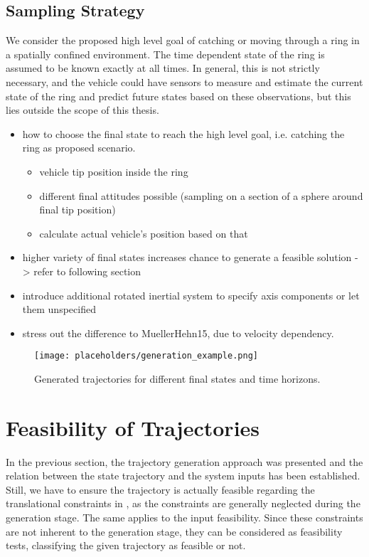 \subsection{Sampling Strategy}
We consider the proposed high level goal of catching or moving through a ring in a spatially confined environment. The time dependent state of the ring is assumed to be known exactly at all times. In general, this is not strictly necessary, and the vehicle could have sensors to measure and estimate the current state of the ring and predict future states based on these observations, but this lies outside the scope of this thesis.


\begin{itemize}
	\color{red}
	\item how to choose the final state to reach the high level goal, i.e. catching the ring as proposed scenario.
	\begin{itemize}
		\item vehicle tip position inside the ring
		\item different final attitudes possible (sampling on a section of a sphere around final tip position)
		\item calculate actual vehicle's position based on that
	\end{itemize}
	\item higher variety of final states increases chance to generate a feasible solution -> refer to following section
	\item introduce additional rotated inertial system to specify axis components or let them unspecified
	\item stress out the difference to MuellerHehn15, due to velocity dependency.
\end{itemize}
\begin{figure}[h!]
	\centering
	\texttt{[image: placeholders/generation\_example.png]}
	\caption{Generated trajectories for different final states and time horizons.}
\end{figure}
\section{Feasibility of Trajectories}
\label{sec:feasibility}
In the previous section, the trajectory generation approach was presented and the relation between the state trajectory and the system inputs has been established.
Still, we have to ensure the trajectory is actually feasible regarding the translational constraints in , as the constraints are generally neglected during the generation stage.
The same applies to the input feasibility.
Since these constraints are not inherent to the generation stage, they can be considered as feasibility tests, classifying the given trajectory as feasible or not. 

